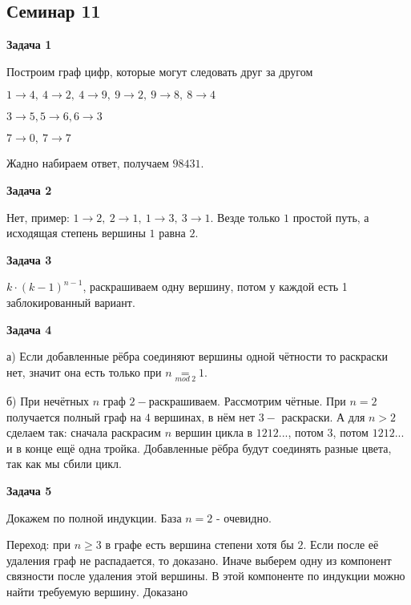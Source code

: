 \subsection{Семинар 11}
\begin{center}
\textbf{Задача 1}
\end{center}
Построим граф цифр, которые могут следовать друг за другом

$\displaystyle 1\rightarrow 4,\ 4\rightarrow 2,\ 4\rightarrow 9,\ 9\rightarrow 2,\ 9\rightarrow 8,\ 8\rightarrow 4$

$\displaystyle 3\rightarrow 5,5\rightarrow 6,6\rightarrow 3$

$\displaystyle 7\rightarrow 0,\ 7\rightarrow 7$

Жадно набираем ответ, получаем $\displaystyle 98431$.

\begin{center}
\textbf{Задача 2}
\end{center}
Нет, пример: $\displaystyle 1\rightarrow 2,\ 2\rightarrow 1,\ 1\rightarrow 3,\ 3\rightarrow 1$. Везде только $\displaystyle 1$ простой путь, а исходящая степень вершины $\displaystyle 1$ равна $\displaystyle 2$.

\begin{center}
\textbf{Задача 3}
\end{center}
$\displaystyle k\cdotp ( k-1)^{n-1}$, раскрашиваем одну вершину, потом у каждой есть 1 заблокированный вариант.

\begin{center}
\textbf{Задача 4}
\end{center}
а) Если добавленные рёбра соединяют вершины одной чётности то раскраски нет, значит она есть только при $\displaystyle n\underset{mod\ 2}{=} 1$.

б) При нечётных $\displaystyle n$ граф $\displaystyle 2-$раскрашиваем. Рассмотрим чётные. При $\displaystyle n=2$ получается полный граф на $\displaystyle 4$ вершинах, в нём нет $\displaystyle 3-$ раскраски. А для $\displaystyle n >2$ сделаем так: сначала раскрасим $\displaystyle n$ вершин цикла в $\displaystyle 1212...$, потом $\displaystyle 3$, потом $\displaystyle 1212...$ и в конце ещё одна тройка. Добавленные рёбра будут соединять разные цвета, так как мы сбили цикл.

\begin{center}
\textbf{Задача 5}
\end{center}
Докажем по полной индукции. База $\displaystyle n=2$ - очевидно.

Переход: при $\displaystyle n\geqslant 3$ в графе есть вершина степени хотя бы $\displaystyle 2$. Если после её удаления граф не распадается, то доказано. Иначе выберем одну из компонент связности после удаления этой вершины. В этой компоненте по индукции можно найти требуемую вершину. Доказано

